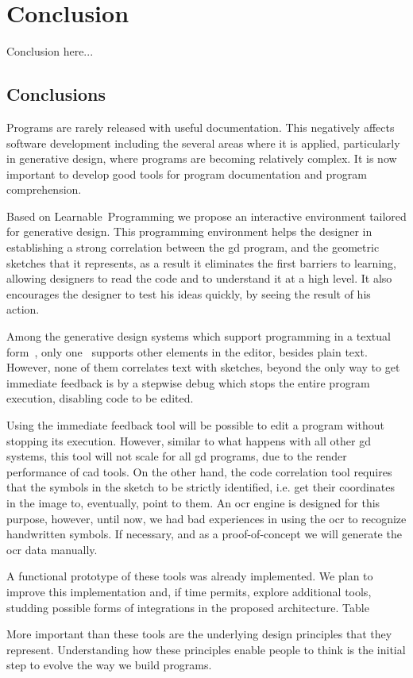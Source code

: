 
\chapter{Conclusion}
\label{chapter:conclusion}
Conclusion here...

\section{Conclusions}
\label{sec:fin}

Programs are rarely released with useful documentation. This negatively affects software development including the several areas where it is applied, particularly in generative design, where programs are becoming relatively complex. It is now important to develop good tools for program documentation and program comprehension.

Based on Learnable~Programming we propose an interactive environment tailored for generative design. This programming environment helps the designer in establishing a strong correlation between the \gls{gd} program, and the geometric sketches that it represents, as a result it eliminates the first barriers to learning, allowing designers to read the code and to understand it at a high level. It also encourages the designer to test his ideas quickly, by seeing the result of his action.

Among the generative design systems which support programming in a textual form~\citep{aish2012designscript,lopes2011portable}, only one~\citep{lopes2011portable} supports other elements in the editor, besides plain text. However, none of them correlates text with sketches, beyond the only way to get immediate feedback is by a stepwise debug which stops the entire program execution, disabling code to be edited.

Using the immediate feedback tool will be possible to edit a program without stopping its execution. However, similar to what happens with all other \gls{gd} systems, this tool will not scale for all \gls{gd} programs, due to the render performance of \gls{cad} tools. On the other hand, the code correlation tool requires that the symbols in the sketch to be strictly identified, i.e. get their coordinates in the image to, eventually, point to them. An \gls{ocr} engine is designed for this purpose, however, until now, we had bad experiences in using the \gls{ocr} to recognize handwritten symbols. If necessary, and as a proof-of-concept we will generate the \gls{ocr} data manually.

A functional prototype of these tools was already implemented. We plan to improve this implementation and, if time permits, explore additional tools, studding possible forms of integrations in the proposed architecture. Table%

More important than these tools are the underlying design principles that they represent. Understanding how these principles enable people to think is the initial step to evolve the way we build programs.
